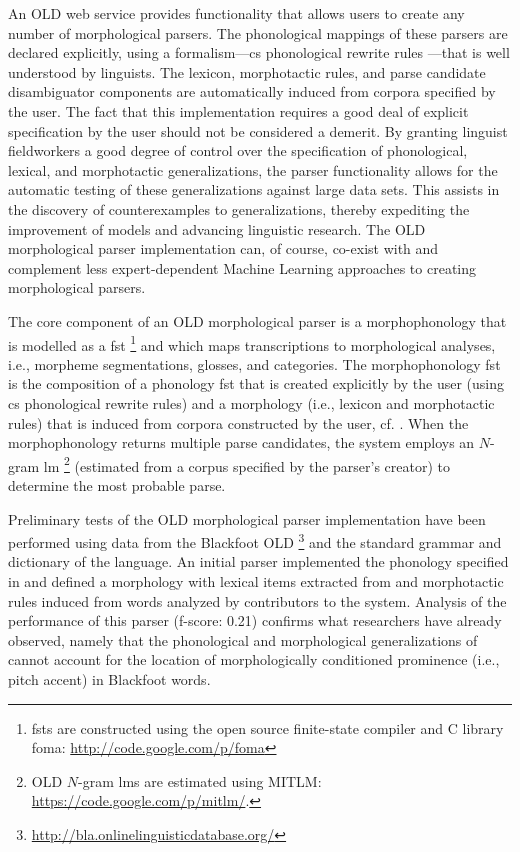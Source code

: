 \documentclass[11pt]{article}
\begin{document}
An OLD web service provides functionality that allows users to create any
number of morphological parsers. The phonological mappings of these parsers
are declared explicitly, using a formalism---\gls{cs} phonological rewrite
rules \cite{chomsky68}---that is well understood by linguists. The lexicon,
morphotactic rules, and parse candidate disambiguator components are
automatically induced from corpora specified by the user. The fact that this
implementation requires a good deal of explicit specification by the user
should not be considered a demerit. By granting linguist fieldworkers a good
degree of control over the specification of phonological, lexical, and
morphotactic generalizations, the parser functionality allows for the automatic
testing of these generalizations against large data sets. This assists
in the discovery of counterexamples to generalizations, thereby expediting
the improvement of models and advancing linguistic research. The OLD
morphological parser implementation can, of course, co-exist with and
complement less expert-dependent Machine Learning approaches to creating
morphological parsers.

The core component of an OLD morphological parser is a morphophonology that is
modelled as a \gls{fst}%
\footnote{\glspl{fst} are constructed using the open source finite-state
compiler and C library foma: \url{http://code.google.com/p/foma}} %
and which maps transcriptions to morphological analyses, i.e., morpheme
segmentations, glosses, and categories. The morphophonology \gls{fst} is the
composition of a phonology \gls{fst} that is created explicitly by the user
(using \gls{cs} phonological rewrite rules) and a morphology (i.e., lexicon and
morphotactic rules) that is induced from corpora constructed by the user, cf. 
\cite{beesley2003finite,hulden2012}. When the morphophonology returns multiple
parse candidates, the system employs an $N$-gram \gls{lm}%
\footnote{OLD $N$-gram \glspl{lm} are estimated using MITLM:
\url{https://code.google.com/p/mitlm/}.} %
(estimated from a corpus specified by the parser's creator) to determine the
most probable parse.

Preliminary tests of the OLD morphological parser implementation have been
performed using data from the Blackfoot OLD%
\footnote{\url{http://bla.onlinelinguisticdatabase.org/}} %
and the standard grammar \cite{frantz91} and dictionary \cite{frantz95} of the
language. An initial parser implemented the phonology specified in
\cite{frantz91} and defined a morphology with lexical items extracted from
\cite{frantz95} and morphotactic rules induced from words analyzed by
contributors to the system. Analysis of the performance of this parser
(f-score: 0.21) confirms what researchers \cite{weber2013} have already
observed, namely that the phonological and morphological generalizations of
\cite{frantz91} cannot account for the location of morphologically conditioned
prominence (i.e., pitch accent) in Blackfoot words.
\end{document}
